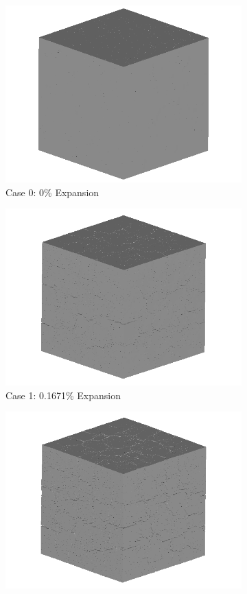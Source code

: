 \begin{figure}[!h]
\centering

    \begin{subfigure}{.5\textwidth}
      \centering
      \includegraphics[width=.8\linewidth]{Files/exp_3D/ASR/A30Undamaged.png} %
    \caption{Case 0: 0\% Expansion}
    \end{subfigure}%
    \begin{subfigure}{.5\textwidth}
      \centering
      \includegraphics[width=.8\linewidth]{Files/exp_3D/DEF/A30X-5C_1_3d.png}
    \caption{Case 1: 0.1671\% Expansion}
    \end{subfigure}
    \begin{subfigure}{.5\textwidth}
      \centering
      \includegraphics[width=.8\linewidth]{Files/exp_3D/DEF/A30X-5C_2_3d.png}

\end{subfigure}
\end{figure}
